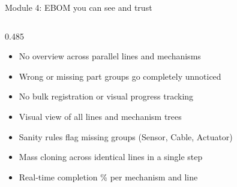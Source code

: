 \begin{frame}{Module 4: EBOM you can see and trust}
\begin{columns}[T]
        \begin{column}{0.485\textwidth}
            \begin{beforebox}[title={\textbf{TODAY}}]
                {\fontsize{7.5}{10}\selectfont\color{darkslate}
                \begin{itemize}\setlength{\itemsep}{2pt}\setlength{\leftmargin}{10pt}
                    \item[\textcolor{problemtext}{\textbullet}] No overview across parallel lines and mechanisms
                    \item[\textcolor{problemtext}{\textbullet}] Wrong or missing part groups go completely unnoticed
                    \item[\textcolor{problemtext}{\textbullet}] No bulk registration or visual progress tracking
                \end{itemize}
                }
            \end{beforebox}
            
            \vspace{0.15cm}
            
            \begin{afterbox}[title={\textbf{WHAT CHANGES}}]
                {\fontsize{7.5}{10}\selectfont\color{darkslate}
                \begin{itemize}\setlength{\itemsep}{2pt}\setlength{\leftmargin}{10pt}
                    \item[\textcolor{primary}{\textbullet}] Visual view of all lines and mechanism trees
                    \item[\textcolor{primary}{\textbullet}] Sanity rules flag missing groups (Sensor, Cable, Actuator)
                    \item[\textcolor{primary}{\textbullet}] Mass cloning across identical lines in a single step
                    \item[\textcolor{primary}{\textbullet}] Real-time completion \% per mechanism and line
                \end{itemize}
                }
            \end{afterbox}
        \end{column}
    \end{columns}
\end{frame}
